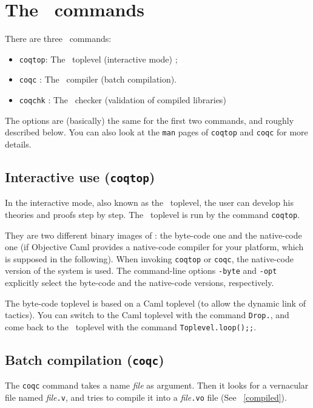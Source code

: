 \chapter[The \Coq~commands]{The \Coq~commands\label{Addoc-coqc}
}

There are three \Coq~commands: 
\begin{itemize}
\item {\tt coqtop}: The \Coq\ toplevel (interactive mode) ; 
\item {\tt coqc} : The \Coq\ compiler (batch compilation).
\item {\tt coqchk} : The \Coq\ checker (validation of compiled libraries)
\end{itemize}
The options are (basically) the same for the first two commands, and
roughly described below. You can also look at the \verb!man! pages of
\verb!coqtop! and \verb!coqc! for more details.


\section{Interactive use ({\tt coqtop})}

In the interactive mode, also known as the \Coq~toplevel, the user can
develop his theories and proofs step by step.  The \Coq~toplevel is
run by the command {\tt coqtop}. 

\label{binary-images}
They are two different binary images of \Coq: the byte-code one and
the native-code one (if Objective Caml provides a native-code compiler
for your platform, which is supposed in the following).  When invoking
\verb!coqtop! or \verb!coqc!, the native-code version of the system is
used.  The command-line options \verb!-byte! and \verb!-opt! explicitly
select the byte-code and the native-code versions, respectively.

The byte-code toplevel is based on a Caml
toplevel (to allow the dynamic link of tactics).  You can switch to
the Caml toplevel with the command \verb!Drop.!, and come back to the
\Coq~toplevel with the command \verb!Toplevel.loop();;!.

\section{Batch compilation ({\tt coqc})}
The {\tt coqc} command takes a name {\em file} as argument.  Then it
looks for a vernacular file named {\em file}{\tt .v}, and tries to
compile it into a {\em file}{\tt .vo} file (See ~\ref{compiled}).


